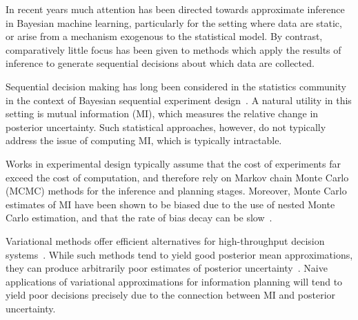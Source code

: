 
In recent years much attention has been directed towards approximate
inference in Bayesian machine learning, particularly for the setting
where data are static, or arise from a mechanism exogenous to the
statistical model.  By contrast, comparatively little focus has been
given to methods which apply the results of inference to generate
sequential decisions about which data are collected.

Sequential decision making has long been considered in the statistics
community in the context of Bayesian sequential experiment
design~\citep{blackwell50, lindley56, bernardo79a}.  A natural utility
in this setting is mutual information (MI), which measures the
relative change in posterior uncertainty.  Such statistical
approaches, however, do not typically address the issue of computing
MI, which is typically intractable.

Works in experimental design typically assume that the cost of
experiments far exceed the cost of computation, and therefore rely on
Markov chain Monte Carlo (MCMC) methods for the inference and planning
stages.  Moreover, Monte Carlo estimates of MI have been shown to be
biased due to the use of nested Monte Carlo estimation, and that the
rate of bias decay can be slow~\citep{zheng2018robust,
rainforth2018nesting}.

Variational methods offer efficient alternatives for high-throughput
decision systems~\citep{wainwright_jordan}.  While such methods tend
to yield good posterior mean approximations, they can produce
arbitrarily poor estimates of posterior
uncertainty~\citep{giordano2015linear, turner2011two}.  Naive
applications of variational approximations for information planning
will tend to yield poor decisions precisely due to the connection
between MI and posterior uncertainty.  



